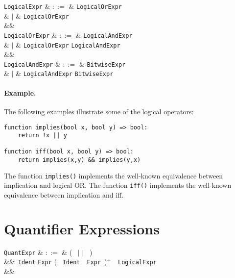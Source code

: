 \begin{syntax}
  \verb+LogicalExpr+ & $::=$ & \verb+LogicalOrExpr+ \big[ \token{<==>} \verb+LogicalExpr+\ \big]\\
                     &  $|$  & \verb+LogicalOrExpr+ \big[ \token{==>} \verb+LogicalExpr+\ \big]\\
  &&\\
  \verb+LogicalOrExpr+ & $::=$ & \verb+LogicalAndExpr+ \\
                           & $|$ & \verb+LogicalOrExpr+ \token{||} \verb+LogicalAndExpr+\\
  &&\\
  \verb+LogicalAndExpr+ & $::=$ & \verb+BitwiseExpr+ \\
                            & $|$ & \verb+LogicalAndExpr+ \token{\&\&} \verb+BitwiseExpr+\\
\end{syntax}

\paragraph{Example.}  The following examples illustrate some of the logical operators:

\begin{lstlisting}
function implies(bool x, bool y) => bool:
    return !x || y

function iff(bool x, bool y) => bool:
    return implies(x,y) && implies(y,x)
\end{lstlisting}

The function \lstinline{implies()} implements the well-known equivalence between implication and logical OR.  The function \lstinline{iff()} implements the well-known equivalence between implication and iff.


\section{Quantifier Expressions}
\label{c_expr_quantifier}

\begin{syntax}
\verb+QuantExpr+ & $::=$ & \big(\  $|$  $|$
\ \big)\ \token{\{}\\
&&\ \verb+Ident+  \verb+Expr+ \big( \token{,}\ \verb+Ident+\
\ \verb+Expr+\ \big)$^+$\ \token{|}\ \verb+LogicalExpr+\\
&& \token{\}}\\
\end{syntax}

